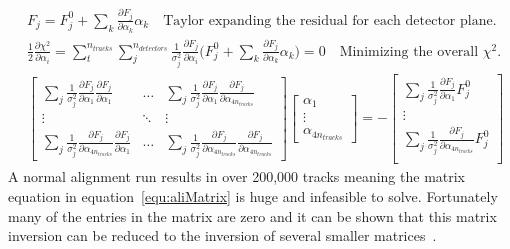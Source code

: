 \begin{subequations}
  \begin{align}
    &F_j = F_j^0 + \sum_k \frac{\partial F_j}{\partial
      \alpha_k}\alpha_k \quad \text{Taylor expanding the residual for
      each detector plane.} \label{equ:F_taylor}\\ &\frac{1}{2}
    \frac{\partial \chi ^2}{\partial \alpha_i} = \sum
    _{t}^{n_{tracks}} \sum_j ^{n_{detectors}}\frac{1}{\sigma_j
      ^2}\frac{\partial F_j}{\partial \alpha_i}\Big ( F_j^0 + \sum_k
    \frac{\partial F_j}{\partial \alpha_k}\alpha_k \Big ) = 0 \quad
    \text{Minimizing the overall $\chi^2$.}\\ & \begin{bmatrix} \sum_j
      \frac{1}{\sigma^2_j}\frac{\partial F_j}{\partial
        \alpha_1}\frac{\partial F_j}{\partial \alpha_1} & \dots &
      \sum_j \frac{1}{\sigma^2_j}\frac{\partial F_j}{\partial
        \alpha_1}\frac{\partial F_j}{\partial \alpha_{4n_{tracks}}}
      \\ \vdots & \ddots & \vdots\\ \sum_j
      \frac{1}{\sigma^2_j}\frac{\partial F_j}{\partial
        \alpha_{4n_{tracks}}}\frac{\partial F_j}{\partial \alpha_1} &
      \dots & \sum_j \frac{1}{\sigma^2_j}\frac{\partial F_j}{\partial
        \alpha_{4n_{tracks}}}\frac{\partial F_j}{\partial
        \alpha_{4n_{tracks}}}
      \end{bmatrix}
    \begin{bmatrix}
      \alpha_1 \\ \vdots \\ \alpha_{4n_{tracks}}
    \end{bmatrix}
    = -
    \begin{bmatrix}
      \sum_j \frac{1}{\sigma^2_j}\frac{\partial F_j}{\partial
        \alpha_1} F_j^0 \\ \vdots \\ \sum_j
      \frac{1}{\sigma^2_j}\frac{\partial F_j}{\partial
        \alpha_{4n_{tracks}}} F_j^0 \\
    \end{bmatrix} \label{equ:aliMatrix}
  \end{align}
  \label{equ:Alignment}
\end{subequations}
A normal alignment run results in over 200,000 tracks meaning the
matrix equation in equation~\ref{equ:aliMatrix} is huge and infeasible
to solve.  Fortunately many of the entries in the matrix are zero and
it can be shown that this matrix inversion can be reduced to the
inversion of several smaller matrices~\cite{matrix_inv}.  \par

